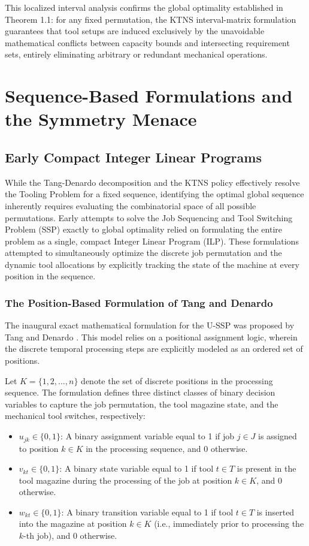\documentclass[11pt, a4paper]{book}
\begin{document}
	This localized interval analysis confirms the global optimality established in Theorem 1.1: for any fixed permutation, the KTNS interval-matrix formulation guarantees that tool setups are induced exclusively by the unavoidable mathematical conflicts between capacity bounds and intersecting requirement sets, entirely eliminating arbitrary or redundant mechanical operations.
	
	\chapter{Sequence-Based Formulations and the Symmetry Menace}
	
	\section{Early Compact Integer Linear Programs}
	
	While the Tang-Denardo decomposition and the KTNS policy effectively resolve the Tooling Problem for a fixed sequence, identifying the optimal global sequence inherently requires evaluating the combinatorial space of all possible permutations. Early attempts to solve the Job Sequencing and Tool Switching Problem (SSP) exactly to global optimality relied on formulating the entire problem as a single, compact Integer Linear Program (ILP). These formulations attempted to simultaneously optimize the discrete job permutation and the dynamic tool allocations by explicitly tracking the state of the machine at every position in the sequence.
	
	\subsection{The Position-Based Formulation of Tang and Denardo}
	
	The inaugural exact mathematical formulation for the U-SSP was proposed by Tang and Denardo \cite{Tang1988}. This model relies on a positional assignment logic, wherein the discrete temporal processing steps are explicitly modeled as an ordered set of positions. 
	
	Let $K = \{1, 2, \dots, n\}$ denote the set of discrete positions in the processing sequence. The formulation defines three distinct classes of binary decision variables to capture the job permutation, the tool magazine state, and the mechanical tool switches, respectively:
	
	\begin{itemize}
		\item $u_{jk} \in \{0,1\}$: A binary assignment variable equal to 1 if job $j \in J$ is assigned to position $k \in K$ in the processing sequence, and 0 otherwise.
		\item $v_{kt} \in \{0,1\}$: A binary state variable equal to 1 if tool $t \in T$ is present in the tool magazine during the processing of the job at position $k \in K$, and 0 otherwise.
		\item $w_{kt} \in \{0,1\}$: A binary transition variable equal to 1 if tool $t \in T$ is inserted into the magazine at position $k \in K$ (i.e., immediately prior to processing the $k$-th job), and 0 otherwise.
	\end{itemize}
	
\end{document}
